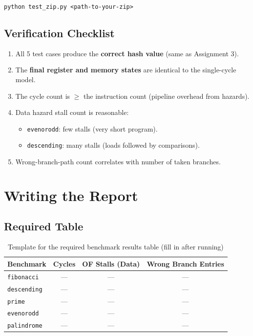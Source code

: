 \documentclass[12pt,a4paper]{article}
\begin{document}
\begin{lstlisting}[style=asmstyle]
python test_zip.py <path-to-your-zip>
\end{lstlisting}

\subsection{Verification Checklist}

\begin{enumerate}[label=$\square$]
    \item All 5 test cases produce the \textbf{correct hash value} (same as Assignment 3).
    \item The \textbf{final register and memory states} are identical to the single-cycle model.
    \item The cycle count is $\geq$ the instruction count (pipeline overhead from hazards).
    \item Data hazard stall count is reasonable:
    \begin{itemize}
        \item \texttt{evenorodd}: few stalls (very short program).
        \item \texttt{descending}: many stalls (loads followed by comparisons).
    \end{itemize}
    \item Wrong-branch-path count correlates with number of taken branches.
\end{enumerate}

\section{Writing the Report}

\subsection{Required Table}

\begin{table}[H]
\centering
\begin{tabular}{@{}lccc@{}}
\toprule
\textbf{Benchmark} & \textbf{Cycles} & \textbf{OF Stalls (Data)} & \textbf{Wrong Branch Entries} \\
\midrule
\texttt{fibonacci} & --- & --- & --- \\
\texttt{descending} & --- & --- & --- \\
\texttt{prime} & --- & --- & --- \\
\texttt{evenorodd} & --- & --- & --- \\
\texttt{palindrome} & --- & --- & --- \\
\bottomrule
\end{tabular}
\caption{Template for the required benchmark results table (fill in after running)}
\end{table}
\end{document}
